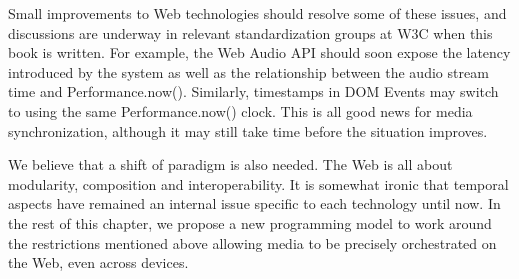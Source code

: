 Small improvements to Web technologies should resolve some of these issues,
and discussions are underway in relevant standardization groups at W3C when
this book is written. For example, the Web Audio API should soon expose the
latency introduced by the system as well as the relationship between the audio
stream time and Performance.now(). Similarly, timestamps in DOM Events may
switch to using the same Performance.now() clock. This is all good news for
media synchronization, although it may still take time before the situation
improves.

We believe that a shift of paradigm is also needed. The Web is all about
modularity, composition and interoperability. It is somewhat ironic that
temporal aspects have remained an internal issue specific to each technology
until now. In the rest of this chapter, we propose a new programming model to
work around the restrictions mentioned above allowing media to be precisely
orchestrated on the Web, even across devices.




